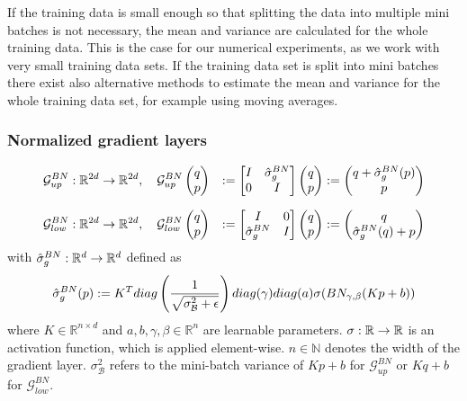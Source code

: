 \documentclass[twoside,a4paper]{article}
\begin{document}
If the training data is small enough so that splitting the data into multiple mini batches
is not necessary, the mean and variance are calculated for the whole training data. This is the
case for our numerical experiments, as we work with very small training data sets.
If the training data set is split into mini batches there exist also alternative methods to estimate
the mean and variance for the whole training data set, for example using moving averages.

\subsubsection{Normalized gradient layers}

\begin{alignat*}{2}
	\mathcal{G}^{BN}_{up} &: \mathbb{R}^{2d} \to \mathbb{R}^{2d}, \quad
	\mathcal{G}^{BN}_{up} \begin{pmatrix} q \\ p \end{pmatrix} &:= \begin{bmatrix} I & {\hat{\sigma}^{BN}_g} \\ 0 & I \end{bmatrix} \begin{pmatrix} q \\ p \end{pmatrix} := \begin{pmatrix}
		q + \hat{\sigma}^{BN}_g(p) \\
		p
	\end{pmatrix} \\[7pt]
	\mathcal{G}^{BN}_{low} &: \mathbb{R}^{2d} \to \mathbb{R}^{2d}, \quad
	\mathcal{G}^{BN}_{low} \begin{pmatrix} q \\ p \end{pmatrix} &:= \begin{bmatrix} I & 0 \\ {\hat{\sigma}^{BN}_g} & I \end{bmatrix} \begin{pmatrix} q \\ p \end{pmatrix} := \begin{pmatrix}
		q \\
		\hat{\sigma}^{BN}_g(q) + p
	\end{pmatrix}
\end{alignat*}
with $\hat{\sigma}^{BN}_g : \mathbb{R}^d \to \mathbb{R}^d$ defined as
\begin{equation*}
	\hat{\sigma}^{BN}_g(p) := 
	K^T diag\left( \frac{1}{\sqrt{\sigma^2_\mathcal{B} + \epsilon}} \right) diag(\gamma)
	diag(a) \sigma(BN_{\gamma, \beta}(Kp+b))
\end{equation*}
where $K \in \mathbb{R}^{n \times d}$ and $a,b, \gamma, \beta \in \mathbb{R}^n$
are learnable parameters. $\sigma : \mathbb{R} \to \mathbb{R}$ 
is an activation function, which is applied element-wise.
$n \in \mathbb{N}$ denotes the width of the gradient layer.
$\sigma^2_\mathcal{B}$ refers to the mini-batch variance of $Kp+b$ for $\mathcal{G}^{BN}_{up}$
or $Kq+b$ for $\mathcal{G}^{BN}_{low}$.

\end{document}
